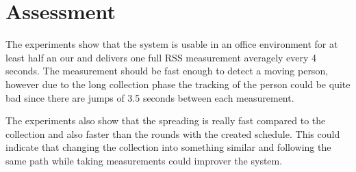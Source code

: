 \section{Assessment}
The experiments show that the system is usable in an office environment for at least half an our and delivers one full RSS measurement averagely every 4 seconds. The measurement should be fast enough to detect a moving person, however due to the long collection phase the tracking of the person could be quite bad since there are jumps of 3.5 seconds between each measurement.

The experiments also show that the spreading is really fast compared to the collection and also faster than the rounds with the created schedule. This could indicate that changing the collection into something similar and following the same path while taking measurements could improver the system. 